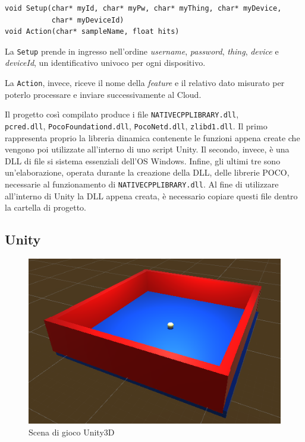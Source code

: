\begin{verbatim}
void Setup(char* myId, char* myPw, char* myThing, char* myDevice,
           char* myDeviceId)
void Action(char* sampleName, float hits)
\end{verbatim}

La \texttt{Setup} prende in ingresso nell'ordine \textit{username}, \textit{password}, \textit{thing}, \textit{device}  e \textit{deviceId}, un identificativo univoco per ogni dispositivo.

La \texttt{Action}, invece, riceve il nome della \textit{feature} e il relativo dato misurato per poterlo processare e inviare successivamente al Cloud.

Il progetto così compilato produce i file \texttt{NATIVECPPLIBRARY.dll}, \\\texttt{pcred.dll}, \texttt{PocoFoundationd.dll}, \texttt{PocoNetd.dll}, \texttt{zlibd1.dll}. Il primo rappresenta proprio la libreria dinamica contenente le funzioni appena create che vengono poi utilizzate all'interno di uno script Unity. Il secondo, invece, è una DLL di file si sistema essenziali dell'OS Windows. Infine, gli ultimi tre sono un’elaborazione, operata durante la creazione della DLL, delle librerie POCO, necessarie al funzionamento di  \texttt{NATIVECPPLIBRARY.dll}. Al fine di utilizzare all'interno di Unity la DLL appena creata, è necessario copiare questi file dentro la cartella di progetto.
\subsection{Unity}

\begin{figure}[H]
	\centering
	\includegraphics[scale=1.1]{pics/ring}
	\caption{Scena di gioco Unity3D}
	\label{ring}
\end{figure}

